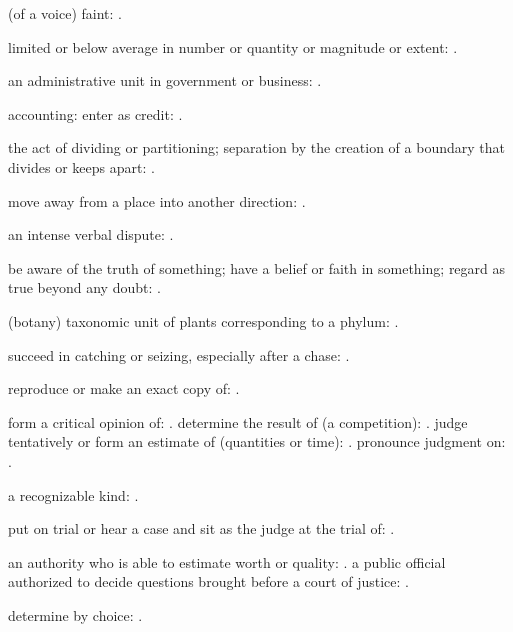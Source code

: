   (of a voice) faint:   .

  limited or below average in number or quantity or magnitude or extent:   .

  an administrative unit in government or business: .

  accounting: enter as credit: .

  the act of dividing or partitioning; separation by the creation of a boundary that divides or keeps apart:   .

  move away from a place into another direction:   .

  an intense verbal dispute: .

  be aware of the truth of something; have a belief or faith in something; regard as true beyond any doubt: .

  (botany) taxonomic unit of plants corresponding to a phylum: .

  succeed in catching or seizing, especially after a chase:   .

  reproduce or make an exact copy of:   .

  form a critical opinion of:   . determine the result of (a competition): . judge tentatively or form an estimate of (quantities or time):   . pronounce judgment on:   .

  a recognizable kind:   .

  put on trial or hear a case and sit as the judge at the trial of:   .

  an authority who is able to estimate worth or quality:   . a public official authorized to decide questions brought before a court of justice:   .

  determine by choice: .

